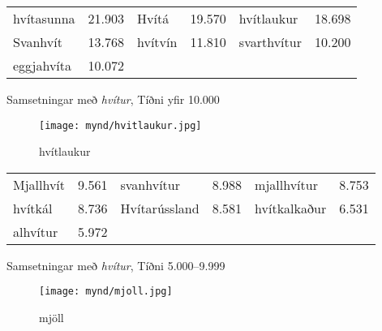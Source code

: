 \documentclass{../litmal.tex}{subfiles}
\begin{document}
\begin{wordlist}[H]
\begin{tcolorbox}

	\setlength{\extrarowheight}{3pt} 
	\begin{tabular}{BlBlBl}
		hvítasunna	& 21.903	&  
		Hvítá		& 19.570	&  
		hvítlaukur	& 18.698	\\ 
		Svanhvít		& 13.768	&  
		hvítvín		& 11.810	& 
		svarthvítur	& 10.200	\\  
		eggjahvíta	& 10.072	&  
					& 			&
					&
	\end{tabular}

\end{tcolorbox}
	\caption{Samsetningar með \textit{hvítur}, Tíðni yfir 10.000}
	\label{listi:hvitt.10000}
\end{wordlist}	
		
\begin{figure}[H]
\begin{tcolorbox}
\centering
	\texttt{[image: mynd/hvitlaukur.jpg]}
\end{tcolorbox}
	\caption{hvítlaukur}
	\label{mynd:hvitlaukur}
\end{figure}

\begin{wordlist}[H]
\begin{tcolorbox}

	\setlength{\extrarowheight}{3pt}
	\begin{tabular}{BlBlBl}
		Mjallhvít		& 9.561 		&  
		svanhvítur	& 8.988		&  
		mjallhvítur	& 8.753		\\  
		hvítkál		& 8.736		&  
		Hvítarússland	 & 8.581		& 
		hvítkalkaður	& 6.531		\\  
		alhvítur		& 5.972		&  
					&			&
					&
	\end{tabular}

\end{tcolorbox}
	\caption{Samsetningar með \textit{hvítur}, Tíðni 5.000--9.999}
	\label{listi:hvitt.5000}
\end{wordlist}

\begin{figure}[H]
\begin{tcolorbox}
\centering
	\texttt{[image: mynd/mjoll.jpg]}
\end{tcolorbox}
	\caption{mjöll}
	\label{mynd:mjöll}
\end{figure}
\end{document}
